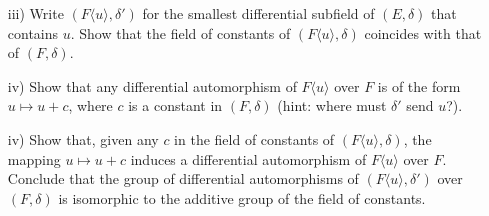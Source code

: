\documentclass[11pt,leqno]{article}
\newcommand{\<}[1]{{\langle}#1 {\rangle}}
\theoremstyle{plain}
\theoremstyle{definition}
\theoremstyle{remark}
\numberwithin{equation}{section}
\begin{document}
\begin{enumerate}
\begin{itemize}
    \item[iii)] Write $(F\langle u \rangle,\delta')$ for the smallest differential subfield of $(E,\delta)$ that contains $u$.  Show that the field of constants of $(F \langle u \rangle,\delta)$ coincides with that of $(F,\delta)$.
    \item[iv)] Show that any differential automorphism of $F \langle u \rangle$ over $F$ is of the form $u \mapsto u + c$, where $c$ is a constant in $(F,\delta)$ (hint: where must $\delta'$ send $u$?).
    \item[iv)] Show that, given any $c$ in the field of constants of $(F \langle u \rangle,\delta)$, the mapping $u \mapsto u+c$ induces a differential automorphism of $F \langle u \rangle$ over $F$.  Conclude that the group of differential automorphisms of $(F\langle u \rangle,\delta')$ over $(F,\delta)$ is isomorphic to the additive group of the field of constants.
    \end{itemize}
\end{enumerate}
\end{document}
